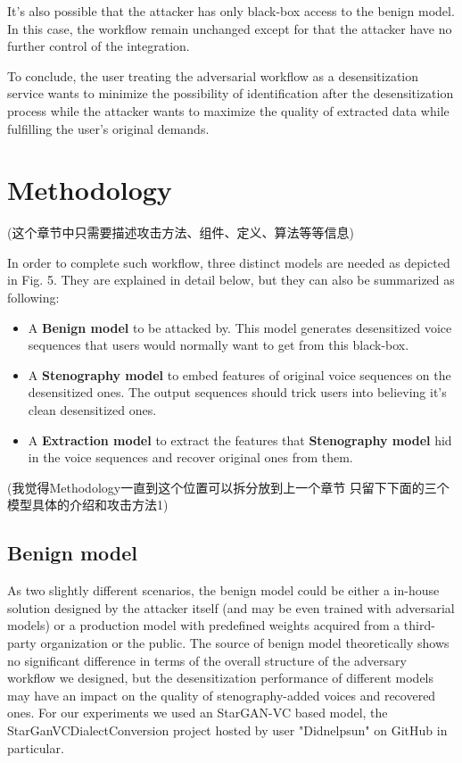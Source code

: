 \documentclass[journal]{IEEEtran} %
\begin{document}
\begin{CJK*}{UTF8}{gbsn}
It's also possible that the attacker has only black-box access to the benign model. In this case, the workflow remain unchanged except for that the attacker have no further control of the integration.

To conclude, the user treating the adversarial workflow as a desensitization service wants to minimize the possibility of identification after the desensitization process while the attacker wants to maximize the quality of extracted data while fulfilling the user's original demands.

\section{Methodology}
(这个章节中只需要描述攻击方法、组件、定义、算法等等信息)

In order to complete such workflow, three distinct models are needed as depicted in Fig. 5. They are explained in detail below, but they can also be summarized as following:
\begin{itemize}
    \item A \textbf{Benign model} to be attacked by. This model generates desensitized voice sequences that users would normally want to get from this black-box.
    \item A \textbf{Stenography model} to embed features of original voice sequences on the desensitized ones. The output sequences should trick users into believing it's clean desensitized ones.
    \item A \textbf{Extraction model} to extract the features that \textbf{Stenography model} hid in the voice sequences and recover original ones from them.
\end{itemize}

(我觉得Methodology一直到这个位置可以拆分放到上一个章节 只留下下面的三个模型具体的介绍和攻击方法1)

\subsection{Benign model}

As two slightly different scenarios, the benign model could be either a in-house solution designed by the attacker itself (and may be even trained with adversarial models) or a production model with predefined weights acquired from a third-party organization or the public. The source of benign model theoretically shows no significant difference in terms of the overall structure of the adversary workflow we designed, but the desensitization performance of different models may have an impact on the quality of stenography-added voices and recovered ones. For our experiments we used an StarGAN-VC\cite{a3} based model, the StarGanVCDialectConversion project hosted by user "Didnelpsun" on GitHub\cite{a2} in particular.


\end{CJK*}
\end{document}
